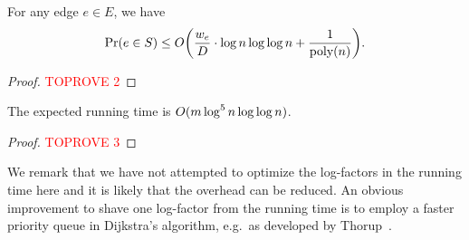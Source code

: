 \begin{lemma} \label{lem:ldd-fast-prob}
For any edge $e \in E$, we have
\begin{equation*}
    \Pr(e \in S) \leq \Order\parens*{\frac{w_e}{D} \cdot \log n \log\log n + \frac{1}{\poly(n)}}.
\end{equation*}
\end{lemma}
\begin{proof}\textcolor{red}{TOPROVE 2}\end{proof}

\begin{lemma} \label{lem:ldd-fast-time}
The expected running time is $O(m \log^5 n \log\log n)$.
\end{lemma}
\begin{proof}\textcolor{red}{TOPROVE 3}\end{proof}

We remark that we have not attempted to optimize the log-factors in the running time here and it is likely that the overhead can be reduced. An obvious improvement to shave one log-factor from the running time is to employ a faster priority queue in Dijkstra's algorithm, e.g.\ as developed by Thorup~\cite{Thorup03}.